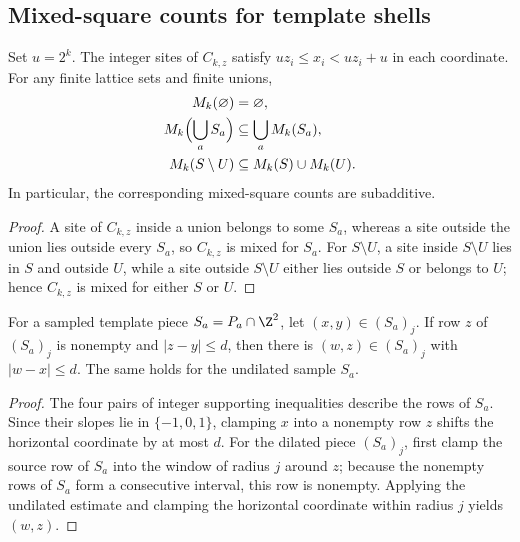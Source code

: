 \subsection{Mixed-square counts for template shells}

\begin{lemma}
    \label{thm:area_law_mixed_dyadic_boolean}
    \leanok
    Set $u=2^k$. The integer sites of $C_{k,z}$ satisfy
    $uz_i\le x_i<uz_i+u$ in each coordinate. For any finite lattice
    sets and finite unions,
    \begin{align}
        M_k(\varnothing)             & =\varnothing,                \\
        M_k\Bigl(\bigcup_a S_a\Bigr) & \subseteq\bigcup_a M_k(S_a), \\
        M_k(S\setminus U)            & \subseteq M_k(S)\cup M_k(U).
    \end{align}
    In particular, the corresponding mixed-square counts are subadditive.
\end{lemma}
\begin{proof}\leanok
    A site of $C_{k,z}$ inside a union belongs to some $S_a$, whereas a site
    outside the union lies outside every $S_a$, so $C_{k,z}$ is mixed for $S_a$.
    For $S\setminus U$, a site inside $S\setminus U$ lies in $S$ and outside
    $U$, while a site outside $S\setminus U$ either lies outside $S$ or belongs
    to $U$; hence $C_{k,z}$ is mixed for either $S$ or $U$.
\end{proof}

\begin{lemma}
    \label{thm:area_law_template_dilated_row_displacement}
    \leanok
    For a sampled template piece $S_a=P_a\cap\Z^2$, let
    $(x,y)\in(S_a)_j$. If row $z$ of $(S_a)_j$ is nonempty and $|z-y|\le d$,
    then there is $(w,z)\in(S_a)_j$ with $|w-x|\le d$. The same holds for
    the undilated sample $S_a$.
\end{lemma}
\begin{proof}\leanok
    The four pairs of integer supporting inequalities describe the rows of
    $S_a$. Since their slopes lie in $\{-1,0,1\}$, clamping $x$ into a nonempty
    row $z$ shifts the horizontal coordinate by at most $d$. For the dilated
    piece $(S_a)_j$, first clamp the source row of $S_a$ into the window of
    radius $j$ around $z$; because the nonempty rows of $S_a$ form a
    consecutive interval, this row is nonempty. Applying the undilated estimate
    and clamping the horizontal coordinate within radius $j$ yields $(w,z)$.
\end{proof}

